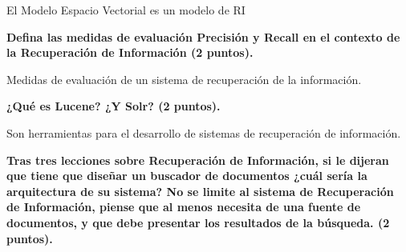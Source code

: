\documentclass[11pt]{exam}
\begin{document}
\begin{questions}
El Modelo Espacio Vectorial es un modelo de RI

{\bf \question Defina las medidas de evaluación Precisión y Recall en el contexto de la Recuperación de Información (2 puntos).}

Medidas de evaluación de un sistema de recuperación de la información.

{\bf \question ¿Qué es Lucene? ¿Y Solr? (2 puntos).}

Son herramientas para el desarrollo de sistemas de recuperación de información.

{\bf \question Tras tres lecciones sobre Recuperación de Información, si le dijeran que tiene que diseñar un buscador de documentos ¿cuál sería la arquitectura de su sistema? No se limite al sistema de Recuperación de Información, piense que al menos necesita de una fuente de documentos, y que debe presentar los resultados de la búsqueda. (2 puntos).}

\end{questions}
	
\end{document}
